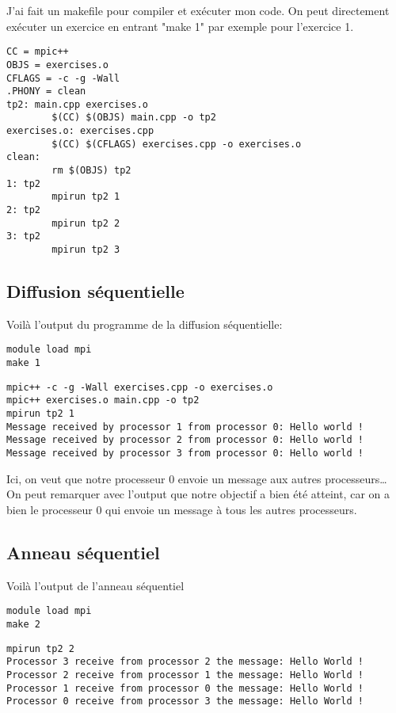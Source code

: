 \documentclass[11pt]{article}
\begin{document}
J'ai fait un makefile pour compiler et exécuter mon code. On peut directement exécuter un exercice en entrant "make 1" par exemple pour l'exercice 1.
\begin{verbatim}
CC = mpic++
OBJS = exercises.o
CFLAGS = -c -g -Wall
.PHONY = clean
tp2: main.cpp exercises.o
        $(CC) $(OBJS) main.cpp -o tp2
exercises.o: exercises.cpp
        $(CC) $(CFLAGS) exercises.cpp -o exercises.o
clean:
        rm $(OBJS) tp2
1: tp2
        mpirun tp2 1
2: tp2
        mpirun tp2 2
3: tp2
        mpirun tp2 3
\end{verbatim}
\subsection{Diffusion séquentielle}
\label{sec:org4998d8d}
Voilà l'output du programme de la diffusion séquentielle:
\begin{verbatim}
module load mpi
make 1
\end{verbatim}

\begin{verbatim}
mpic++ -c -g -Wall exercises.cpp -o exercises.o
mpic++ exercises.o main.cpp -o tp2
mpirun tp2 1
Message received by processor 1 from processor 0: Hello world !
Message received by processor 2 from processor 0: Hello world !
Message received by processor 3 from processor 0: Hello world !
\end{verbatim}


Ici, on veut que notre processeur 0 envoie un message aux autres processeurs\ldots{} On peut remarquer avec l'output que notre objectif a bien été atteint,
car on a bien le processeur 0 qui envoie un message à tous les autres processeurs.

\subsection{Anneau séquentiel}
\label{sec:org826f488}

Voilà l'output de l'anneau séquentiel

\begin{verbatim}
module load mpi
make 2
\end{verbatim}

\begin{verbatim}
mpirun tp2 2
Processor 3 receive from processor 2 the message: Hello World !
Processor 2 receive from processor 1 the message: Hello World !
Processor 1 receive from processor 0 the message: Hello World !
Processor 0 receive from processor 3 the message: Hello World !
\end{verbatim}
\end{document}
